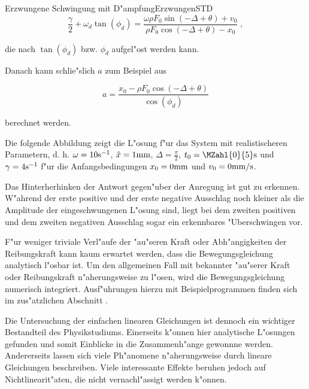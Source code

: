 \begin{MXContent}{Erzwungene Schwingung mit D"ampfung}{Erzwungen}{STD}
\begin{equation}
  \frac{\gamma}{2} + \omega_d \tan\left(\phi_d\right) = \frac{\omega\rho F_0 \sin\left(-\Delta+\theta\right)+v_0}{\rho F_0\cos\left(-\Delta+\theta\right) - x_0} \; ,
\end{equation}

die nach $\tan\left(\phi_d\right)$ bzw. $\phi_d$ aufgel"ost werden kann.

Danach kann schlie"slich $a$ zum Beispiel aus

\begin{equation}
  a = \frac{x_0-\rho F_0\cos\left(-\Delta+\theta\right)}{\cos\left(\phi_d\right)}
\end{equation}

berechnet werden.

Die folgende Abbildung zeigt die L"osung f"ur das System mit realistischeren Parametern, d. h. $\omega = 10\mathrm{s^{-1}}$, $\hat{x}=1\mathrm{mm}$, $\Delta = \frac{\pi}{2}$, $t_0 = \MZahl{0}{5}\mse{s}$ und $\gamma=4\mathrm{s^{-1}}$ f"ur die Anfangsbedingungen $x_0=0\mathrm{mm}$ und $v_0 = 0\mathrm{mm/s}$.

\begin{center}
  \end{center}

Das Hinterherhinken der Antwort gegen"uber der Anregung ist gut zu erkennen. W"ahrend der erste positive und der erste negative Ausschlag noch kleiner als die Amplitude der eingeschwungenen L"osung sind, liegt bei dem zweiten positiven und dem zweiten negativen Ausschlag sogar ein erkennbares "Uberschwingen vor.

F"ur weniger triviale Verl"aufe der "au"seren Kraft oder Abh"angigkeiten der Reibungskraft kann kaum erwartet werden, dass die Bewegungsgleichung analytisch l"osbar ist. Um den allgemeinen Fall mit bekannter "au"serer Kraft oder Reibungskraft n"aherungsweise zu l"osen, wird die Bewegungsgleichung numerisch integriert. Ausf"uhrungen hierzu mit Beispielprogrammen finden sich im zus"atzlichen Abschnitt 
.

Die Untersuchung der einfachen linearen Gleichungen ist dennoch ein wichtiger Bestandteil des Physikstudiums. Einerseits k"onnen hier analytische L"osungen gefunden und somit Einblicke in die Zusammenh"ange gewonnne werden. Andererseits lassen sich viele Ph"anomene n"aherungsweise durch lineare Gleichungen beschreiben. Viele interessante Effekte beruhen jedoch auf Nichtlinearit"aten, die nicht vernachl"assigt werden k"onnen.

\end{MXContent}


